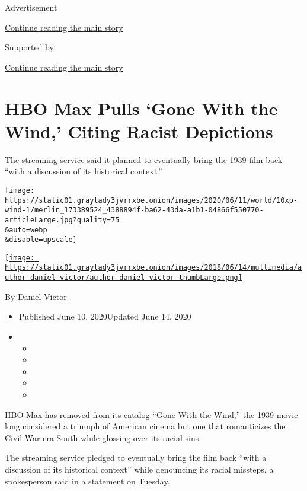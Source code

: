 Advertisement

\protect\hyperlink{after-top}{Continue reading the main story}

Supported by

\protect\hyperlink{after-sponsor}{Continue reading the main story}

\hypertarget{hbo-max-pulls-gone-with-the-wind-citing-racist-depictions}{%
\section{HBO Max Pulls `Gone With the Wind,' Citing Racist
Depictions}\label{hbo-max-pulls-gone-with-the-wind-citing-racist-depictions}}

The streaming service said it planned to eventually bring the 1939 film
back ``with a discussion of its historical context.''

\texttt{[image: https://static01.graylady3jvrrxbe.onion/images/2020/06/11/world/10xp-wind-1/merlin\_173389524\_4388894f-ba62-43da-a1b1-04866f550770-articleLarge.jpg?quality=75\\\&auto=webp\\\&disable=upscale]}

\href{https://www.nytimes3xbfgragh.onion/by/daniel-victor}{\texttt{[image: https://static01.graylady3jvrrxbe.onion/images/2018/06/14/multimedia/author-daniel-victor/author-daniel-victor-thumbLarge.png]}}

By \href{https://www.nytimes3xbfgragh.onion/by/daniel-victor}{Daniel
Victor}

\begin{itemize}
\item
  Published June 10, 2020Updated June 14, 2020
\item
  \begin{itemize}
  \item
  \item
  \item
  \item
  \item
  \end{itemize}
\end{itemize}

HBO Max has removed from its catalog
``\href{https://www.nytimes3xbfgragh.onion/2020/07/26/movies/olivia-de-havilland-dead.html}{Gone
With the Wind},'' the 1939 movie long considered a triumph of American
cinema but one that romanticizes the Civil War-era South while glossing
over its racial sins.

The streaming service pledged to eventually bring the film back ``with a
discussion of its historical context'' while denouncing its racial
missteps, a spokesperson said in a statement on Tuesday.

